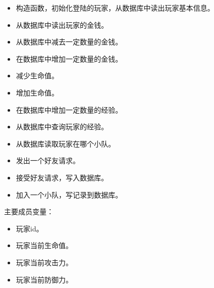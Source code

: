\documentclass{article}
\begin{document}
\begin{itemize}[noitemsep,topsep=\mdcompacttopsep]%

\item{}构造函数，初始化登陆的玩家，从数据库中读出玩家基本信息。%

\item{}从数据库中读出玩家的金钱。%

\item{}从数据库中减去一定数量的金钱。%

\item{}在数据库中增加一定数量的金钱。%

\item{}减少生命值。%

\item{}增加生命值。%

\item{}在数据库中增加一定数量的经验。%

\item{}从数据库中查询玩家的经验。%

\item{}从数据库读取玩家在哪个小队。%

\item{}发出一个好友请求。%

\item{}接受好友请求，写入数据库。%

\item{}加入一个小队，写记录到数据库。%
\end{itemize}%

\noindent{}主要成员变量：%

\begin{itemize}[noitemsep,topsep=\mdcompacttopsep]%

\item{}玩家id。%

\item{}玩家当前生命值。%

\item{}玩家当前攻击力。%

\item{}玩家当前防御力。%
\end{itemize}%
\end{document}
